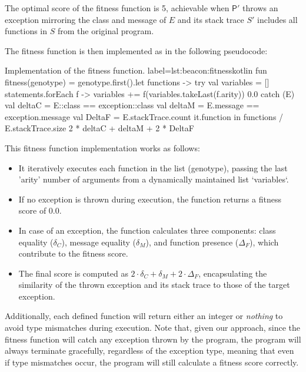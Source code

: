         The optimal score of the fitness function is 5, achievable when \(\mathsf{P'}\) throws an exception mirroring 
        the class and message of \(E\) and its stack trace \(S'\) includes all functions in \(S\) from the original 
        program.
    
        The fitness function is then implemented as in the following pseudocode:

        \begin{code}{%
            Implementation of the fitness function.
        }{label=lst:beacon:fitness}{kotlin}
            fun fitness(genotype) = genotype.first().let { functions ->
                try {
                    val variables = []
                    statements.forEach { f ->
                        variables += f(variables.takeLast(f.arity))
                    }
                    0.0
                } catch (E) {
                    val deltaC = E::class == exception::class
                    val deltaM = E.message == exception.message
                    val DeltaF = E.stackTrace.count { it.function in functions } / E.stackTrace.size
                    2 * deltaC + deltaM + 2 * DeltaF
                }
            }
        \end{code}

        This fitness function implementation works as follows: 
        \begin{itemize}
            \item It iteratively executes each function in the list (genotype), passing the last 'arity' number of arguments from a dynamically maintained list `variables`. 
            \item If no exception is thrown during execution, the function returns a fitness score of 0.0.
            \item In case of an exception, the function calculates three components: class equality (\(\delta_C\)), message equality (\(\delta_M\)), and function presence (\(\Delta_F\)), which contribute to the fitness score.
            \item The final score is computed as \(2 \cdot \delta_C + \delta_M + 2 \cdot \Delta_F\), encapsulating the similarity of the thrown exception and its stack trace to those of the target exception.
        \end{itemize}
        
        Additionally, each defined function will return either an integer or \textit{nothing} to avoid type mismatches
        during execution. Note that, given our approach, since the fitness function will catch any exception thrown by
        the program, the program will always terminate gracefully, regardless of the exception type, meaning that even
        if type mismatches occur, the program will still calculate a fitness score correctly.

